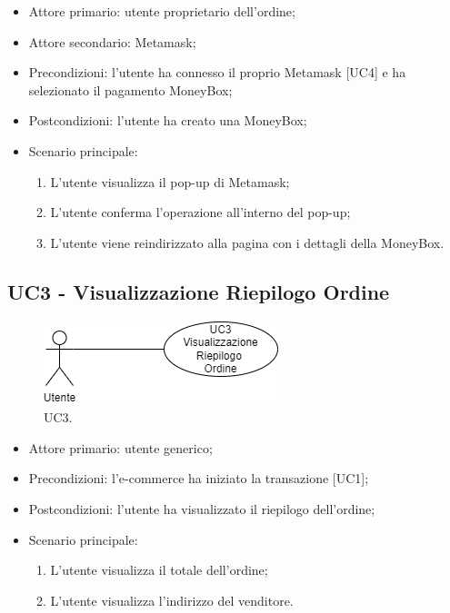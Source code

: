 \begin{itemize}
    \item Attore primario: utente proprietario dell'ordine;
    \item Attore secondario: Metamask\glo{};
    \item Precondizioni: l'utente ha connesso il proprio Metamask\glo{} [UC4] e ha selezionato il pagamento MoneyBox\glo{};
    \item Postcondizioni: l'utente ha creato una MoneyBox\glo{};
    \item Scenario principale:
          \begin{enumerate}
              \item L'utente visualizza il pop-up di Metamask\glo{};
              \item L'utente conferma l'operazione all'interno del pop-up;
              \item L'utente viene reindirizzato alla pagina con i dettagli della MoneyBox\glo{}.
          \end{enumerate}
\end{itemize}

\subsection{UC3 - Visualizzazione Riepilogo Ordine}

\begin{figure}[H]
    \centering
    \includegraphics[scale=0.7]{immagini/UseCases-UC3.png}
    \caption{UC3.}
\end{figure}

\begin{itemize}
    \item Attore primario: utente generico;
    \item Precondizioni: l'e-commerce\glo{} ha iniziato la transazione [UC1];
    \item Postcondizioni: l'utente ha visualizzato il riepilogo dell'ordine;
    \item Scenario principale:
          \begin{enumerate}
              \item L'utente visualizza il totale dell'ordine;
              \item L'utente visualizza l'indirizzo del venditore.
          \end{enumerate}
\end{itemize}


